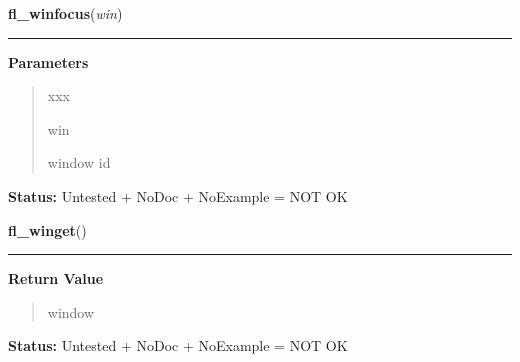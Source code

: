 \hspace{.8\funcindent}\begin{boxedminipage}{\funcwidth}

    \raggedright \textbf{fl\_winfocus}(\textit{win})

    \vspace{-1.5ex}

    \rule{\textwidth}{0.5\fboxrule}
\setlength{\parskip}{2ex}
\setlength{\parskip}{1ex}
      \textbf{Parameters}
      \vspace{-1ex}

      \begin{quote}
        \begin{Ventry}{xxx}

          \item[win]

          window id

        \end{Ventry}

      \end{quote}

\textbf{Status:} Untested + NoDoc + NoExample = NOT OK



    \end{boxedminipage}

    \label{xformslib:library:fl_winget}

    \vspace{0.5ex}

\hspace{.8\funcindent}\begin{boxedminipage}{\funcwidth}

    \raggedright \textbf{fl\_winget}()

    \vspace{-1.5ex}

    \rule{\textwidth}{0.5\fboxrule}
\setlength{\parskip}{2ex}
\setlength{\parskip}{1ex}
      \textbf{Return Value}
    \vspace{-1ex}

      \begin{quote}
      window

      \end{quote}

\textbf{Status:} Untested + NoDoc + NoExample = NOT OK



    \end{boxedminipage}

